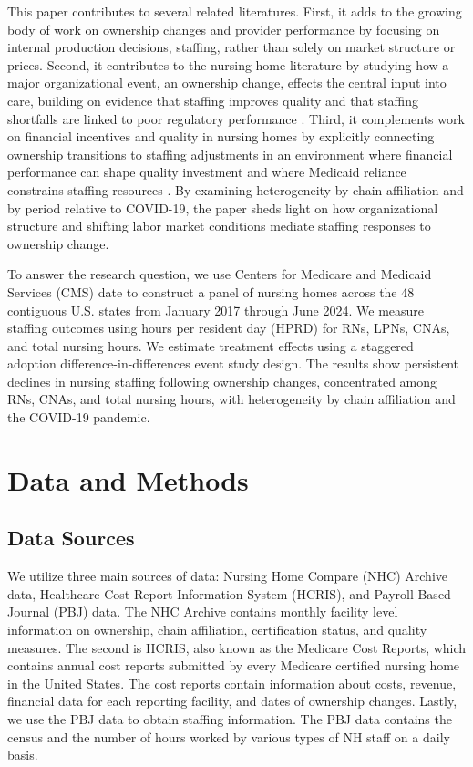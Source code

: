 \documentclass[preprint,authoryear]{elsarticle}
\begin{document}
This paper contributes to several related literatures. First, it adds to the growing body of work on ownership changes and provider performance by focusing on internal production decisions, staffing, rather than solely on market structure or prices. Second, it contributes to the nursing home literature by studying how a major organizational event, an ownership change, effects the central input into care, building on evidence that staffing improves quality \citep{lin_2014} and that staffing shortfalls are linked to poor regulatory performance \citep{harrington_et_al_2000}. Third, it complements work on financial incentives and quality in nursing homes by explicitly connecting ownership transitions to staffing adjustments in an environment where financial performance can shape quality investment \citep{park_werner_2011} and where Medicaid reliance constrains staffing resources \citep{bowblis_brunt_2025}. By examining heterogeneity by chain affiliation and by period relative to COVID-19, the paper sheds light on how organizational structure and shifting labor market conditions mediate staffing responses to ownership change.

To answer the research question, we use Centers for Medicare and Medicaid Services (CMS) date to construct a panel of nursing homes across the 48 contiguous U.S. states from January 2017 through June 2024. We measure staffing outcomes using hours per resident day (HPRD) for RNs, LPNs, CNAs, and total nursing hours. We estimate treatment effects using a staggered adoption difference-in-differences event study design. The results show persistent declines in nursing staffing following ownership changes, concentrated among RNs, CNAs, and total nursing hours, with heterogeneity by chain affiliation and the COVID-19 pandemic.

\section{Data and Methods}
\subsection{Data Sources}
We utilize three main sources of data: Nursing Home Compare (NHC) Archive data, Healthcare Cost Report Information System (HCRIS), and Payroll Based Journal (PBJ) data. The NHC Archive contains monthly facility level information on ownership, chain affiliation, certification status, and quality measures. The second is HCRIS, also known as the Medicare Cost Reports, which contains annual cost reports submitted by every Medicare certified nursing home in the United States. The cost reports contain information about costs, revenue, financial data for each reporting facility, and dates of ownership changes. Lastly, we use the PBJ data to obtain staffing information. The PBJ data contains the census and the number of hours worked by various types of NH staff on a daily basis.
\end{document}
